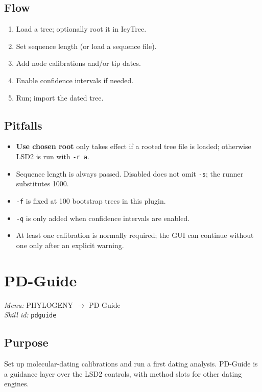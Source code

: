 \documentclass[11pt]{report}
\begin{document}
\subsection{Flow}

\begin{enumerate}
  \item Load a tree; optionally root it in IcyTree.
  \item Set sequence length (or load a sequence file).
  \item Add node calibrations and/or tip dates.
  \item Enable confidence intervals if needed.
  \item Run; import the dated tree.
\end{enumerate}

\subsection{Pitfalls}

\begin{itemize}
  \item \textbf{Use chosen root} only takes effect if a rooted tree file is loaded; otherwise LSD2 is run with \texttt{-r a}.
  \item Sequence length is always passed. Disabled does not omit \texttt{-s}; the runner substitutes 1000.
  \item \texttt{-f} is fixed at 100 bootstrap trees in this plugin.
  \item \texttt{-q} is only added when confidence intervals are enabled.
  \item At least one calibration is normally required; the GUI can continue without one only after an explicit warning.
\end{itemize}


\section{PD-Guide}
\noindent\textit{Menu:} PHYLOGENY $\rightarrow$ PD-Guide\\
\noindent\textit{Skill id:} \texttt{pdguide}

\subsection{Purpose}

Set up molecular-dating calibrations and run a first dating analysis. PD-Guide is a guidance layer over the LSD2 controls, with method slots for other dating engines.
\end{document}
